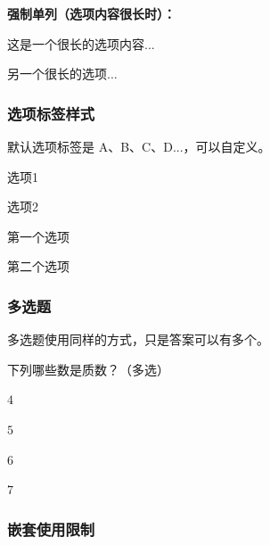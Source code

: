 \textbf{强制单列（选项内容很长时）：}

\begin{latexcode}
  \begin{choices}[columns = 1]
    \item 这是一个很长的选项内容...
    \item 另一个很长的选项...
  \end{choices}
\end{latexcode}

\subsubsection{选项标签样式}

默认选项标签是 A、B、C、D...，可以自定义。

\begin{latexcode}
  \begin{choices}[label = \arabic*.]
    \item 选项1
    \item 选项2
  \end{choices}

  \begin{choices}[label = \circlednumber*]
    \item 第一个选项
    \item 第二个选项
  \end{choices}
\end{latexcode}

\subsubsection{多选题}

多选题使用同样的方式，只是答案可以有多个。

\begin{latexcode}
  \begin{question}
    下列哪些数是质数？（多选）\paren[BD]
    \begin{choices}
      \item $4$
      \item* $5$
      \item $6$
      \item* $7$
    \end{choices}
  \end{question}
\end{latexcode}

\subsubsection{嵌套使用限制}

